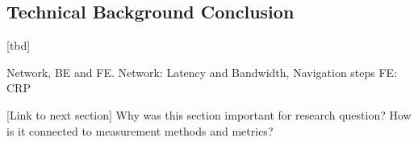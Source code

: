 \subsection{Technical Background Conclusion}

[tbd]

Network, BE and FE.
Network: Latency and Bandwidth, Navigation steps
FE: CRP

[Link to next section]
Why was this section important for research question?
How is it connected to measurement methods and metrics?













